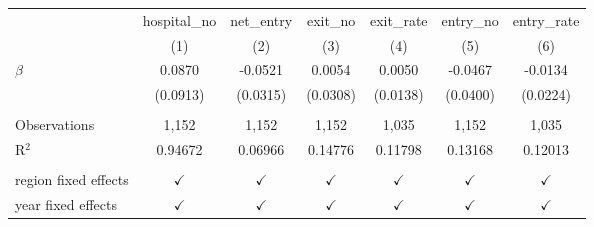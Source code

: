 \begingroup
\centering
\begin{tabular}{lcccccc}
   \toprule
                        & hospital\_no  & net\_entry    & exit\_no      & exit\_rate    & entry\_no     & entry\_rate\\   
                        & (1)           & (2)           & (3)           & (4)           & (5)           & (6)\\  
   \midrule 
   $\beta$              & 0.0870        & -0.0521       & 0.0054        & 0.0050        & -0.0467       & -0.0134\\   
                        & (0.0913)      & (0.0315)      & (0.0308)      & (0.0138)      & (0.0400)      & (0.0224)\\   
    \\
   Observations         & 1,152         & 1,152         & 1,152         & 1,035         & 1,152         & 1,035\\  
   R$^2$                & 0.94672       & 0.06966       & 0.14776       & 0.11798       & 0.13168       & 0.12013\\  
    \\
   region fixed effects & $\checkmark$  & $\checkmark$  & $\checkmark$  & $\checkmark$  & $\checkmark$  & $\checkmark$\\   
   year fixed effects   & $\checkmark$  & $\checkmark$  & $\checkmark$  & $\checkmark$  & $\checkmark$  & $\checkmark$\\   
   \bottomrule
\end{tabular}
\par\endgroup

